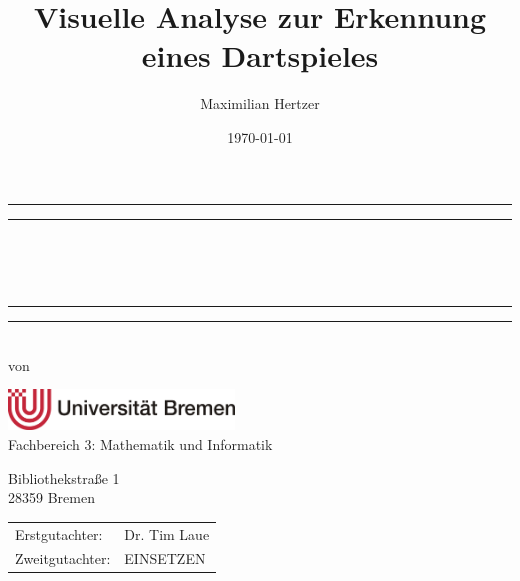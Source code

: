 \documentclass[
  ,a4paper
  ,ngerman
  ,twoside
  ,openright
  ,11pt
  ,bibliography=totoc
  ,index=totoc
  ,listof=totoc
  ,titlepage=true
  ,headlines=2
  ,footlines=2
  ,svgnames
  ,BCOR=5mm
  ,numbers=noendperiod
  ]{scrreprt}
\author{Maximilian Hertzer}
\title{Visuelle Analyse zur Erkennung eines Dartspieles}
\subtitle{}
\date{\today}
\begin{document}
\thispagestyle{empty}

\makeatletter
\begin{titlepage}
	\centering
	\rule[0.5ex]{\linewidth}{2pt}\vspace*{-\baselineskip}\vspace*{3.2pt}
	\rule[0.5ex]{\linewidth}{1pt}\\[\baselineskip]
	{\Huge \@title }\\[4mm]
	{\Large \textit{\@subject}}\\
	\rule[0.5ex]{\linewidth}{1pt}\vspace*{-\baselineskip}\vspace{3.2pt}
	\rule[0.5ex]{\linewidth}{2pt}\\
	\vspace{6.5mm}
	{\large von}\\
	\vspace{6.5mm}
	{\LARGE \textsc{\@author}}
	
	\vspace{11mm}
	\includegraphics[width=6cm]{media/uni-bremen}\\
	\vspace{3mm}
	{\large Fachbereich 3: Mathematik und Informatik}
	
	Bibliothekstraße 1 \\
	28359 Bremen
	
	\vspace{9mm}
	{\large\textsc{\@date}}
	\vfill
    \begin{tabular}{ll}
        
        Erstgutachter:  & Dr. Tim Laue\\
        Zweitgutachter: & EINSETZEN\\
    \end{tabular}
	\vspace{12mm}
\end{titlepage}
\makeatother
\cleardoublepage
\listoftodos
\tableofcontents

\listoffigures
\begingroup
\let\cleardoublepage\relax
\listoftables
\endgroup








\printbibliography

\appendix

\end{document}
